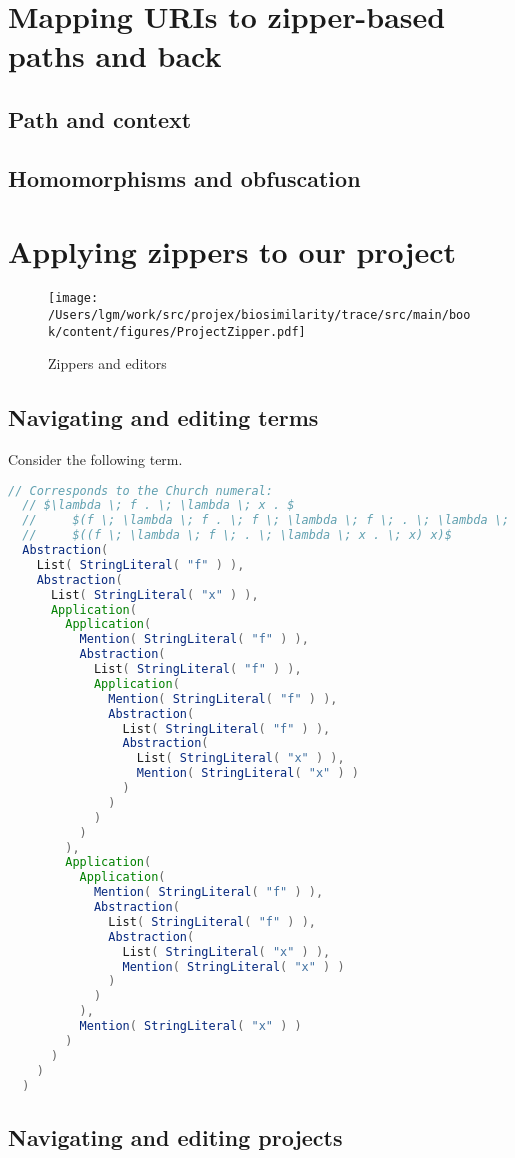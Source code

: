 \section{Mapping URIs to zipper-based paths and back}

\subsection{Path and context}

\subsection{Homomorphisms and obfuscation}

\section{Applying zippers to our project}

\begin{figure}[tbp]
\begin{center}
{ \texttt{[image: /Users/lgm/work/src/projex/biosimilarity/trace/src/main/book/content/figures/ProjectZipper.pdf]} }
\caption{ Zippers and editors }
\end{center}
\end{figure}
\subsection{Navigating and editing terms}

Consider the following term.

\begin{lstlisting}[language=Scala,mathescape=true]
  // Corresponds to the Church numeral: 
  // $\lambda \; f . \; \lambda \; x . $
  //     $(f \; \lambda \; f . \; f \; \lambda \; f \; . \; \lambda \; x . \; x )$
  //     $((f \; \lambda \; f \; . \; \lambda \; x . \; x) x)$ 
  Abstraction(
    List( StringLiteral( "f" ) ),
    Abstraction(
      List( StringLiteral( "x" ) ),
      Application( 
        Application(
          Mention( StringLiteral( "f" ) ),
          Abstraction( 
            List( StringLiteral( "f" ) ),
            Application( 
              Mention( StringLiteral( "f" ) ),
              Abstraction(
                List( StringLiteral( "f" ) ),
                Abstraction(
                  List( StringLiteral( "x" ) ),
                  Mention( StringLiteral( "x" ) )
                )
              )
            )
          )
        ),
        Application(
          Application( 
            Mention( StringLiteral( "f" ) ),
            Abstraction(
              List( StringLiteral( "f" ) ),
              Abstraction(
                List( StringLiteral( "x" ) ),
                Mention( StringLiteral( "x" ) )
              )
            )
          ),
          Mention( StringLiteral( "x" ) )  
        )
      )
    )
  )
\end{lstlisting}

\subsection{Navigating and editing projects}
